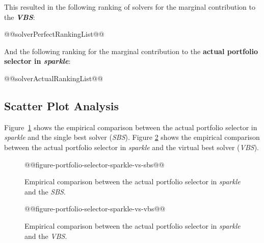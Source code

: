 \documentclass[british]{article}
\newif\iftest
\begin{document}
This resulted in the following ranking of solvers for the marginal contribution to the \textbf{{\em VBS}}:

\begin{enumerate}
@@solverPerfectRankingList@@
\end{enumerate}

And the following ranking for the marginal contribution to the \textbf{actual portfolio selector in \emph{sparkle}}:

\begin{enumerate} 
@@solverActualRankingList@@
\end{enumerate}


\subsection{Scatter Plot Analysis}

Figure~\ref{fig:sparkle_vs_sbs} shows the empirical comparison between the actual portfolio selector in \emph{sparkle} and the single best solver (\emph{SBS}).
Figure \ref{fig:sparkle_vs_vbs} shows the empirical comparison between the actual portfolio selector in \emph{sparkle} and the virtual best solver (\emph{VBS}).

\begin{figure}[htbp]
\noindent \begin{centering}
@@figure-portfolio-selector-sparkle-vs-sbs@@
\par\end{centering}

\caption{Empirical comparison between the actual portfolio selector in \emph{sparkle} and the \emph{SBS}.}\label{fig:sparkle_vs_sbs}
\end{figure}

\begin{figure}[htbp]
\noindent \begin{centering}
@@figure-portfolio-selector-sparkle-vs-vbs@@
\par\end{centering}

\caption{Empirical comparison between the actual portfolio selector in \emph{sparkle} and the \emph{VBS}.}\label{fig:sparkle_vs_vbs}
\end{figure}


\iftest
\section{Experimental Results on the Test Set}
\label{sec:Experimental_Results_Test}

In this section, the PAR@@penalty@@ results for the current portfolio selector in \emph{sparkle} on solving the test instance set @@testInstanceClass@@ is reported.

\begin{itemize}
\item \textbf{Actual Portfolio Selector in \emph{sparkle}}, PAR@@penalty@@: @@testActualPAR@@
\end{itemize}
\fi




\end{document}
